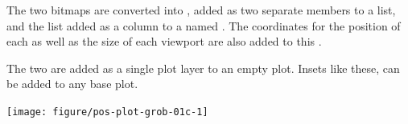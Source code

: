 \documentclass[krantz2]{krantz}\usepackage{knitr}
\begin{document}
The two bitmaps are converted into , added as two separate members to a list, and the list added as a column to a  named . The coordinates for the position of each  as well as the size of each viewport are also added to this .

\begin{knitrout}\footnotesize
{}\color{fgcolor}\begin{kframe}
\begin{alltt}
 \hlkwb{<-}
  \hlstd{(} \hlstd{=} \hlstd{(}\hlstd{,} \hlstd{),}  \hlstd{=} \hlstd{(}\hlstd{,} \hlstd{),}  \hlstd{=} \hlopt{/}\hlstd{,}  \hlstd{=} \hlstd{(}\hlopt{/}\hlstd{),}
              \hlstd{=} \hlstd{(}\hlopt{::}\hlstd{(} 
                            \hlopt{::}\hlstd{(} 
\end{alltt}
\end{kframe}
\end{knitrout}

The two  are added as a single plot layer to an empty plot. Insets like these, can be added to any base plot.

\begin{knitrout}\footnotesize
{}\color{fgcolor}\begin{kframe}
\begin{alltt}
\hlstd{()} \hlopt{+}
  \hlstd{(} 
             \hlstd{=} \hlstd{(}     
                             
                           \hlstd{=} \hlstd{,}  \hlstd{=} \hlstd{)}
\end{alltt}
\end{kframe}

{\centering \texttt{[image: figure/pos-plot-grob-01c-1]} 

}


\end{knitrout}
\end{document}
